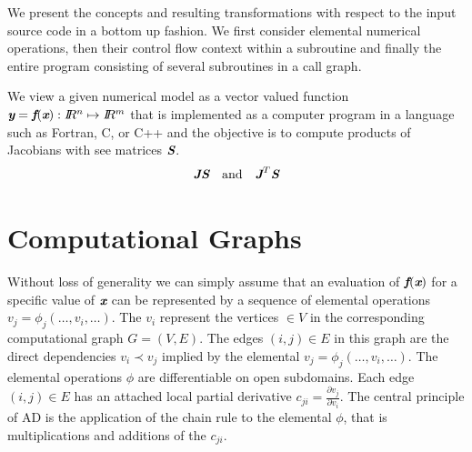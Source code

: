 \documentclass{book}
\newcommand{\R}{I\!\!R}
\newcommand{\bmf}{\mbox{\bf\em f}}
\newcommand{\bmJ}{\mbox{\bf\em J}}
\newcommand{\bmS}{\mbox{\bf\em S}}
\newcommand{\bmx}{\mbox{\bf\em x}}
\newcommand{\bmy}{\mbox{\bf\em y}}
\begin{document}
We present the concepts and resulting transformations 
with respect to the input source code 
in a bottom up fashion.  
We first consider elemental numerical operations, 
then their control flow context within a subroutine and finally the entire program 
consisting of several subroutines in a call graph. 

We view a given numerical model as a 
vector valued function $\bmy=\bmf(\bmx): \R^n\mapsto \R^m$ that is implemented 
as a computer program in a language such as Fortran, C, or C++ and the objective is to  
compute products of Jacobians with see matrices $\bmS$.
\begin{equation}\label{eqn:JacVecProds}
\bmJ \bmS \quad \mbox{and} \quad \bmJ^T \bmS
\end{equation}
\section{Computational Graphs} \label{sec:computationalGraphs}

Without loss of generality we can simply assume that an evaluation of $\bmf(\bmx)$ for  
a specific value of $\bmx$ can be represented by a sequence of 
elemental operations $v_j=\phi_j(\ldots,v_i,\ldots)$. 
The $v_i$ represent the vertices $\in V$ in the corresponding computational 
graph $G=(V,E)$. The edges $(i,j)\in E$ in this graph are the direct dependencies 
$v_i\prec v_j$ implied by the elemental $v_j=\phi_j(\ldots,v_i,\ldots)$.
The elemental operations $\phi$ are differentiable on open subdomains. 
Each edge $(i,j)\in E$ has an attached local partial derivative 
$c_{ji}=\frac{\partial v_j}{\partial v_i}$. 
The central principle of AD is 
the application of the chain rule to the elemental $\phi$, that is 
multiplications and additions of the  $c_{ji}$.  
\end{document}
